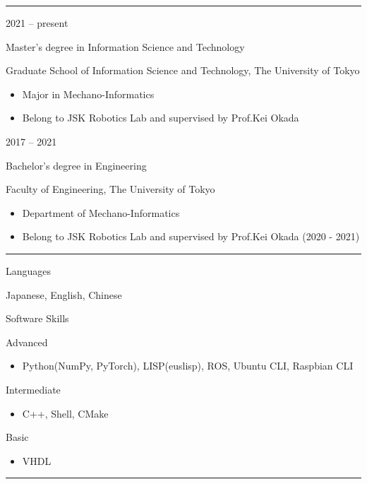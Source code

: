 \documentclass[a4paper,10pt]{article}
\newlength{\cvcolumngapwidth}
\newlength{\cvleftcolumnwidth}
\newlength{\cvrightcolumnwidth}
\newcommand{\cvsectionstyle}[1]{{\normalsize\cvsectionfont\textcolor{cvsectioncolor}{#1}}}
\newcommand{\cvtitlestyle}[1]{{\large\cvtitlefont\textcolor{cvtitlecolor}{#1}}}
\newcommand{\cvdurationstyle}[1]{{\small\cvdurationfont\textcolor{cvdurationcolor}{#1}}}
\newcommand{\cvheadingstyle}[1]{{\normalsize\cvheadingfont\textcolor{cvheadingcolor}{#1}}}
\newlength{\cvafteritemskipamount}
\newlength{\cvaftersectionskipamount}
\newlength{\cvbetweensectionandheadingextraskipamount}
\newlength{\cvaftertitleskipamount}
\newlength{\cvparskip}
\newcommand{\cvsection}[1]{
    \begin{minipage}[t]{\cvleftcolumnwidth}
        \raggedleft\cvsectionstyle{#1}
    \end{minipage}%
    \hspace{\cvcolumngapwidth}%
    \begin{minipage}[t]{\cvrightcolumnwidth}
        \textcolor{cvrulecolor}{\rule{\cvrightcolumnwidth}{0.3mm}}
    \end{minipage}

    \vspace{\cvaftersectionskipamount}
}
\newcommand{\cvitem}[2]{
    \begin{minipage}[t]{\cvleftcolumnwidth}
        \raggedleft #1
    \end{minipage}%
    \hspace{\cvcolumngapwidth}%
    \begin{minipage}[t]{\cvrightcolumnwidth}
        \setlength{\parskip}{\cvparskip} #2
    \end{minipage}

    \vspace{\cvafteritemskipamount}
}
\newcommand{\cvtitle}[1]{
    \cvtitlestyle{#1}

    \vspace{\cvaftertitleskipamount}
    \vspace{-\cvparskip}
}
\begin{document}

\cvsection{EDUCATION}

\cvitem{
    \cvdurationstyle{2021 -- present}
}{
    \cvtitle{Master's degree in Information Science and Technology}

    Graduate School of Information Science and Technology, The University of Tokyo

    \begin{itemize}[leftmargin=*]
        \item Major in Mechano-Informatics 
        \item Belong to JSK Robotics Lab and supervised by Prof.Kei Okada
    \end{itemize}
}

\cvitem{
    \cvdurationstyle{2017 -- 2021}
}{
    \cvtitle{Bachelor's degree in Engineering}

    Faculty of Engineering, The University of Tokyo

    \begin{itemize}[leftmargin=*]
        \item Department of Mechano-Informatics
        \item Belong to JSK Robotics Lab and supervised by Prof.Kei Okada (2020 - 2021)
    \end{itemize}
}



\cvsection{SKILLS}

\vspace{\cvbetweensectionandheadingextraskipamount}

\cvitem{
    \cvheadingstyle{Languages}
}{
  Japanese, English, Chinese
}

\cvitem{
    \cvheadingstyle{Software Skills}
}{
  Advanced
  \begin{itemize}
    \item Python(NumPy, PyTorch), LISP(euslisp), ROS, Ubuntu CLI, Raspbian CLI
  \end{itemize}
  Intermediate
  \begin{itemize}
    \item C++, Shell, CMake 
  \end{itemize}
  Basic
  \begin{itemize}
    \item VHDL
  \end{itemize}
}



\cvsection{PUBLICATIONS}
\end{document}
